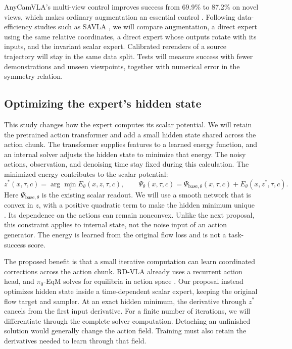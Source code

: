 AnyCamVLA's multi-view control improves success from 69.9\% to 87.2\% on novel views, which makes ordinary augmentation an essential control \cite{heo2026anycam}. Following data-efficiency studies such as SAVLA \cite{li2026savla}, we will compare augmentation, a direct expert using the same relative coordinates, a direct expert whose outputs rotate with its inputs, and the invariant scalar expert. Calibrated rerenders of a source trajectory will stay in the same data split. Tests will measure success with fewer demonstrations and unseen viewpoints, together with numerical error in the symmetry relation.

\subsection{Optimizing the expert's hidden state}
This study changes how the expert computes its scalar potential. We will retain the pretrained action transformer and add a small hidden state shared across the action chunk. The transformer supplies features to a learned energy function, and an internal solver adjusts the hidden state to minimize that energy. The noisy actions, observation, and denoising time stay fixed during this calculation. The minimized energy contributes to the scalar potential:
\begin{equation}
z^*(x,\tau,c)=\arg\min_z E_\theta(x,z,\tau,c),\qquad
\Psi_\theta(x,\tau,c)=\Psi_{\mathrm{base},\theta}(x,\tau,c)+E_\theta(x,z^*,\tau,c).
\end{equation}
Here $\Psi_{\mathrm{base},\theta}$ is the existing scalar readout. We will use a smooth network that is convex in $z$, with a positive quadratic term to make the hidden minimum unique \cite{icnn,gould2022ddn}. Its dependence on the actions can remain nonconvex. Unlike the next proposal, this constraint applies to internal state, not the noise input of an action generator. The energy is learned from the original flow loss and is not a task-success score.

The proposed benefit is that a small iterative computation can learn coordinated corrections across the action chunk. RD-VLA already uses a recurrent action head, and $\pi_0$-EqM solves for equilibria in action space \cite{rdvla,pi0eqm}. Our proposal instead optimizes hidden state inside a time-dependent scalar expert, keeping the original flow target and sampler. At an exact hidden minimum, the derivative through $z^*$ cancels from the first input derivative. For a finite number of iterations, we will differentiate through the complete solver computation. Detaching an unfinished solution would generally change the action field. Training must also retain the derivatives needed to learn through that field.

